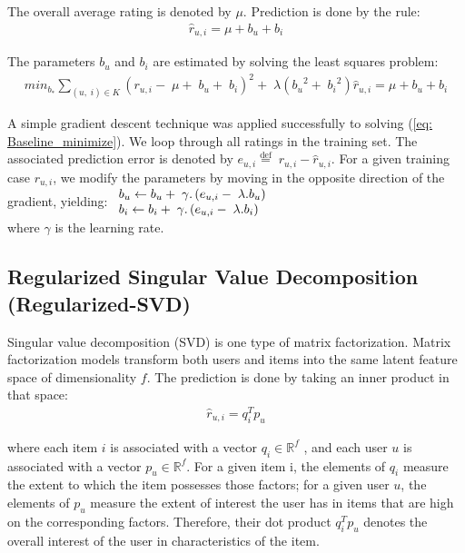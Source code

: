 \documentclass[oneside,13pt]{extreport}
\begin{document}
The overall average rating is denoted by $\mu$. Prediction is done by the rule:
\begin{eqnarray}
\label{eq:Baseline_predict}
{\hat r_{u,i}} = \mu + {b_u} + {b_i}
\end{eqnarray}

The parameters $b_u$ and $b_i$ are estimated by solving the least squares problem: 
\begin{eqnarray}
mi{n_{{b_*}}}\mathop \sum \limits_{\left( {u,\;i} \right) \in K} {\left( {{r_{u,i}} - \;\mu  + \;{b_u} + \;{b_i}} \right)^2} + \;\lambda \left( {{b_u}^2 + \;{b_i}^2} \right)
\label{eq:Baseline_minimize}
{\hat r_{u,i}} = \mu + {b_u} + {b_i}
\end{eqnarray}

 A simple gradient descent technique was applied successfully to solving (\ref{eq: Baseline_minimize}).
We loop through all ratings in the training set. The associated prediction error is denoted by ${e_{u,i}} \stackrel{\text{def}}{=} \;{r_{u,i}} - \hat r_{u,i}$. For a given training case $r_{u,i}$, we modify the parameters by moving in the opposite direction of the gradient, yielding:
$
\begin{array}{l}{b_u} \leftarrow {b_u} + {\rm{\;}}\gamma .\left( {{e_{u,i}} - {\rm{\;}}\lambda .{b_u}} \right)\\{b_i} \leftarrow {b_i} + {\rm{\;}}\gamma .\left( {{e_{u,i}} - {\rm{\;}}\lambda .{b_i}} \right)\end{array}
$
\\where $\gamma$ is the learning rate.
\subsection{Regularized Singular Value Decomposition (Regularized-SVD)}
Singular value decomposition (SVD) is one type of matrix factorization. Matrix factorization models transform both users and items into the same latent feature space of dimensionality $f$. The prediction is done by taking an inner product in that space: 
\begin{eqnarray}
\label{eq:MF_predict}
{\hat r_{u,i}} = q_i^T{p_u} 
\end{eqnarray}

where each item $i$ is associated with a vector ${q_i} \in {\mathbb{R}^f}$ , and each user $u$ is associated with a vector ${p_u} \in {\mathbb{R}^f}$. For a given item i, the elements of $q_i$
measure the extent to which the item possesses those factors; for a given user $u$, the elements of $p_u$ measure the extent of interest the user has in items that are high on the corresponding factors. Therefore, their dot product $q_i^T{p_u}$ denotes the overall interest of the user in characteristics of the item.
\end{document}
